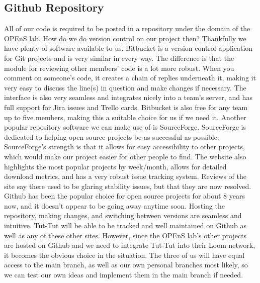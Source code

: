 \documentclass[letterpaper,10pt,draftclsnofoot,onecolumn]{article}
\begin{document}
\subsection{Github Repository}
All of our code is required to be posted in a repository under the domain of the OPEnS lab. How do we do version control on our project then? Thankfully we have plenty of software available to us.
\newline
\newline
Bitbucket is a version control application for Git projects and is very similar in every way. The difference is that the module for reviewing other members' code is a lot more robust. When you comment on someone's code, it creates a chain of replies underneath it, making it very easy to discuss the line(s) in question and make changes if necessary. The interface is also very seamless and integrates nicely into a team's server, and has full support for Jira issues and Trello cards. Bitbucket is also free for any team up to five members, making this a suitable choice for us if we need it.
\cite{bitbucket}
\newline
\newline
Another popular repository software we can make use of is SourceForge. SourceForge is dedicated to helping open source projects be as successful as possible. SourceForge's strength is that it allows for easy accessibility to other projects, which would make our project easier for other people to find. The website also highlights the most popular projects by week/month, allows for detailed download metrics, and has a very robust issue tracking system. Reviews of the site say there used to be glaring stability issues, but that they are now resolved. 
\cite{sourceforge}
\newline
\newline
Github has been the popular choice for open source projects for about 8 years now, and it doesn't appear to be going away anytime soon. Hosting the repository, making changes, and switching between versions are seamless and intuitive. Tut-Tut will be able to be tracked and well maintained on Github as well as any of these other sites. However, since the OPEnS lab's other projects are hosted on Github and we need to integrate Tut-Tut into their Loom network, it becomes the obvious choice in the situation. The three of us will have equal access to the main branch, as well as our own personal branches most likely, so we can test our own ideas and implement them in the main branch if needed.
\end{document}

